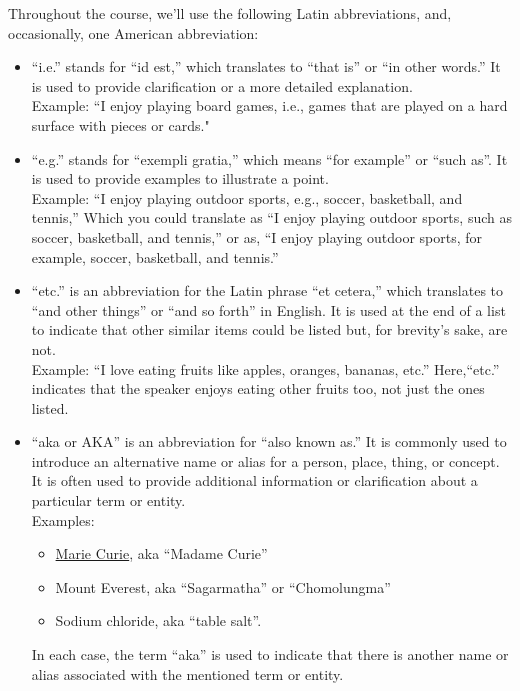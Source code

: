 Throughout the course, we'll use the following Latin abbreviations, and, occasionally, one American abbreviation:

\bigskip
\begin{tcolorbox}[title=\textbf{Abbreviations:}, breakable]
\begin{itemize}
\item ``i.e.'' stands for ``id est,'' which translates to ``that is'' or ``in other words.'' It is used to provide clarification or a more detailed explanation. \\
Example: ``I enjoy playing board games, i.e., games that are played on a hard surface with pieces or cards."
\item ``e.g.'' stands for ``exempli gratia,'' which means ``for example'' or ``such as''. It is used to provide examples to illustrate a point. \\
Example: ``I enjoy playing outdoor sports, e.g., soccer, basketball, and tennis,'' Which you could translate as ``I enjoy playing outdoor sports, such as soccer, basketball, and tennis,'' or as, ``I enjoy playing outdoor sports, for example, soccer, basketball, and tennis.''
\item ``etc.'' is an abbreviation for the Latin phrase ``et cetera,'' which translates to ``and other things'' or ``and so forth'' in English. It is used at the end of a list to indicate that other similar items could be listed but, for brevity's sake, are not.\\
Example: ``I love eating fruits like apples, oranges, bananas, etc.'' Here,``etc.'' indicates that the speaker enjoys eating other fruits too, not just the ones listed.
\item ``aka or AKA''  is an abbreviation for ``also known as.'' It is commonly used to introduce an alternative name or alias for a person, place, thing, or concept. It is often used to provide additional information or clarification about a particular term or entity.\\
Examples:
\begin{itemize}
    \item \href{https://en.wikipedia.org/wiki/Marie_Curie}{Marie Curie}, aka ``Madame Curie''
    \item Mount Everest, aka ``Sagarmatha'' or ``Chomolungma''
    \item Sodium chloride, aka ``table salt''.
\end{itemize}
In each case, the term ``aka'' is used to indicate that there is another name or alias associated with the mentioned term or entity.
\end{itemize}
\end{tcolorbox}

